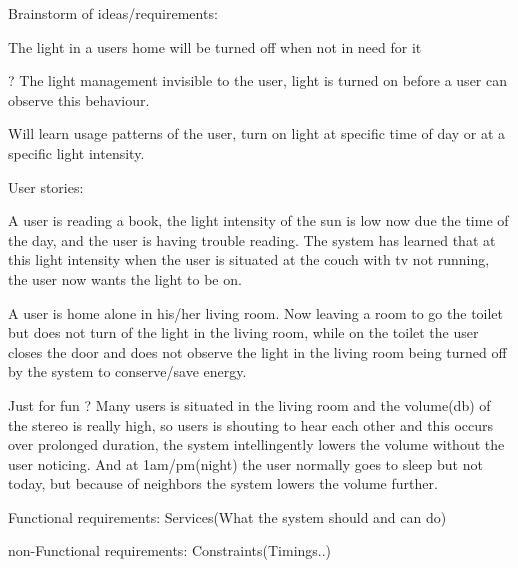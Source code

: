 Brainstorm of ideas/requirements:

The light in a users home will be turned off when not in need for it

? The light management invisible to the user, light is turned on before a user can observe this behaviour.

Will learn usage patterns of the user, turn on light at specific time of day or at a specific light intensity.

User stories:

A user is reading a book, the light intensity of the sun is low now due the time of the day, and the user is having trouble reading. The system has learned that at this light intensity when the user is situated at the couch with tv not running, the user now wants the light to be on.

A user is home alone in his/her living room. Now leaving a room to go the toilet but does not turn of the light in the living room, while on the toilet the user closes the door and does not observe the light in the living room being turned off by the system to conserve/save energy.

Just for fun ? Many users is situated in the living room and the volume(db) of the stereo is really high, so users is shouting to hear each other and this occurs over prolonged duration, the system intellingently lowers the volume without the user noticing. And at 1am/pm(night) the user normally goes to sleep but not today, but because of neighbors the system lowers the volume further.


Functional requirements:
Services(What the system should and can do)

non-Functional requirements:
Constraints(Timings..)
